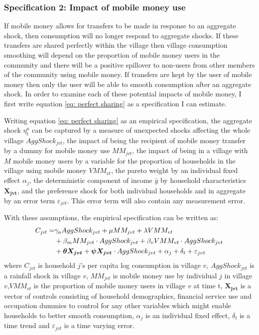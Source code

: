 \subsubsection{Specification 2: Impact of mobile money use}
If mobile money allows for transfers to be made in response to an aggregate shock, then consumption will no longer respond to aggregate shocks. If these transfers are shared perfectly within the village then village consumption smoothing will depend on the proportion of mobile money users in the community and there will be a positive spillover to non-users from other members of the community using mobile money. If transfers are kept by the user of mobile money then only the user will be able to smooth consumption after an aggregate shock. In order to examine each of these potential impacts of mobile money, I first write equation \ref{eq: perfect sharing} as a specification I can estimate.  

Writing equation \ref{eq: perfect sharing} as an empirical specification, the aggregate shock $\eta^a_t$ can be captured by a measure of unexpected shocks affecting the whole village $AggShock_{jvt}$, the impact of being the recipient of mobile money transfer by a dummy for mobile money use $MM_{jvt}$, the impact of being in a village with $M$ mobile money users by a variable for the proportion of households in the village using mobile money $VMM_{vt}$, the pareto weight by an individual fixed effect $\alpha_j$, the deterministic component of income $\bar{y}$ by household characteristics $\bm{X_{jvt}}$, and the preference shock for both individual households and in aggregate by an error term $\varepsilon_{jvt}$. This error term will also contain any measurement error. 
 

With these assumptions, the empirical specification can be written as:
\begin{align} \label{eq: specification agg shock}
C_{jit} = &  \gamma_a AggShock_{jvt} + \mu MM_{jvt}   +\lambda VMM_{vt}  \notag \\
&  + \beta_m MM_{jvt}\cdot AggShock_{jvt} +\beta_v VMM_{vt}\cdot AggShock_{jvt} \notag \\
& + \bm{\theta X_{jvt}} +  \bm{\psi X_{jvt}} \cdot AggShock_{jvt} +  \alpha_j + \delta_t + \varepsilon_{jvt} 
\end{align}
where $C_{jvt}$ is household $j$'s per capita log consumption in village $v$, $AggShock_{jvt}$ is a rainfall shock in village $v$, $MM_{jvt}$ is mobile money use by individual $j$ in village $v$,$VMM_{vt}$ is the proportion of mobile money users in village $v$ at time t, $\bm{X_{jvt}}$ is a vector of controls consisting of household demographics, financial service use and occupation dummies to control for any other variables which might enable households to better smooth consumption, $\alpha_j$ is an individual fixed effect, $\delta_t$ is a time trend and $\varepsilon_{jvt}$ is a time varying error. 

